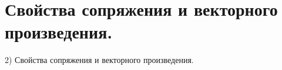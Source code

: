 \section{
 Свойства сопряжения и векторного произведения.
}

2) Свойства сопряжения и векторного произведения.
